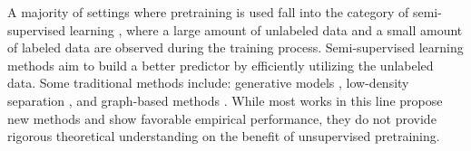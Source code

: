 A majority of settings where pretraining is used fall into the category of semi-supervised learning \citep[see, e.g., ][]{zhu2005semi}, where a large amount of unlabeled data and a small amount of labeled data are observed during the training process. Semi-supervised learning methods aim to build a better predictor by efficiently utilizing the unlabeled data. Some traditional methods include: generative models \citep[e.g.][]{ratsaby1995learning}, low-density separation \citep{joachims1999transductive,lawrence2004semi,szummer2002information}, and graph-based methods \citep{belkin2006manifold}. While most works in this line propose new methods and show favorable empirical performance, they do not provide rigorous theoretical understanding on the benefit of unsupervised pretraining.






